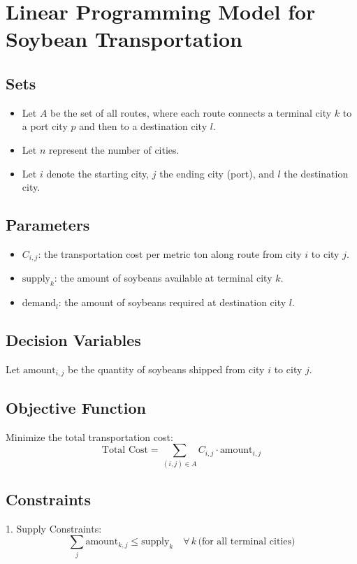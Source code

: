 \documentclass{article}
\begin{document}
\section*{Linear Programming Model for Soybean Transportation}

\subsection*{Sets}
\begin{itemize}
    \item Let \( A \) be the set of all routes, where each route connects a terminal city \( k \) to a port city \( p \) and then to a destination city \( l \).
    \item Let \( n \) represent the number of cities.
    \item Let \( i \) denote the starting city, \( j \) the ending city (port), and \( l \) the destination city.
\end{itemize}

\subsection*{Parameters}
\begin{itemize}
    \item \( C_{i,j} \): the transportation cost per metric ton along route from city \( i \) to city \( j \).
    \item \( \text{supply}_{k} \): the amount of soybeans available at terminal city \( k \).
    \item \( \text{demand}_{l} \): the amount of soybeans required at destination city \( l \).
\end{itemize}

\subsection*{Decision Variables}
Let \( \text{amount}_{i,j} \) be the quantity of soybeans shipped from city \( i \) to city \( j \).

\subsection*{Objective Function}
Minimize the total transportation cost:
\[
\text{Total Cost} = \sum_{(i,j) \in A} C_{i,j} \cdot \text{amount}_{i,j}
\]

\subsection*{Constraints}
1. Supply Constraints:
\[
\sum_{j} \text{amount}_{k,j} \leq \text{supply}_{k} \quad \forall \, k \, \text{(for all terminal cities)}
\]
\end{document}
